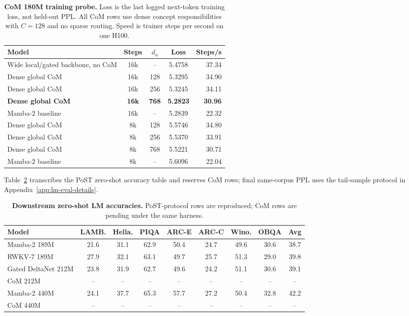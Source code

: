 \begin{table}[H]
\centering
\caption{\textbf{CoM 180M training probe.} Loss is the last logged next-token training loss, not held-out PPL. All CoM rows use dense concept responsibilities with $C=128$ and no sparse routing. Speed is trainer steps per second on one H100.}
\label{tab:com-training-probe}
\small
\begin{tabular}{@{}lcccr@{}}
\toprule
\textbf{Model} & \textbf{Steps} & \textbf{$d_u$} & \textbf{Loss} & \textbf{Steps/s} \\
\midrule
Wide local/gated backbone, no CoM & 16k & --  & 5.4758 & 37.34 \\
Dense global CoM & 16k & 128 & 5.3295 & 34.90 \\
Dense global CoM & 16k & 256 & 5.3245 & 34.11 \\
\textbf{Dense global CoM} & \textbf{16k} & \textbf{768} & \textbf{5.2823} & \textbf{30.96} \\
Mamba-2 baseline & 16k & -- & 5.2839 & 22.32 \\
\midrule
Dense global CoM & 8k & 128 & 5.5746 & 34.80 \\
Dense global CoM & 8k & 256 & 5.5370 & 33.91 \\
Dense global CoM & 8k & 768 & 5.5221 & 30.71 \\
Mamba-2 baseline & 8k & -- & 5.6096 & 22.04 \\
\bottomrule
\end{tabular}
\end{table}

Table~\ref{tab:lm-main} transcribes the PoST zero-shot accuracy table and reserves CoM rows; final same-corpus PPL uses the tail-sample protocol in Appendix~\ref{app:lm-eval-details}.

\begin{table}[H]
\centering
\caption{\textbf{Downstream zero-shot LM accuracies.} PoST-protocol rows are reproduced; CoM rows are pending under the same harness.}
\label{tab:lm-main}
\small
\begin{tabular}{@{}lcccccccc@{}}
\toprule
\textbf{Model} & LAMB. & Hella. & PIQA & ARC-E & ARC-C & Wino. & OBQA & Avg \\
\midrule
Mamba-2 189M
  & 21.6 & 31.1 & 62.9 & 50.4 & 24.7 & 49.6 & 30.6 & 38.7 \\
RWKV-7 189M
  & 27.9 & 32.1 & 63.1 & 49.7 & 25.7 & 51.3 & 29.0 & 39.8 \\
Gated DeltaNet 212M
  & 23.8 & 31.9 & 62.7 & 49.6 & 24.2 & 51.1 & 30.6 & 39.1 \\
CoM 212M
  & -- & -- & -- & -- & -- & -- & -- & -- \\
\midrule
Mamba-2 440M
  & 24.1 & 37.7 & 65.3 & 57.7 & 27.2 & 50.4 & 32.8 & 42.2 \\
CoM 440M
  & -- & -- & -- & -- & -- & -- & -- & -- \\
\bottomrule
\end{tabular}
\end{table}
